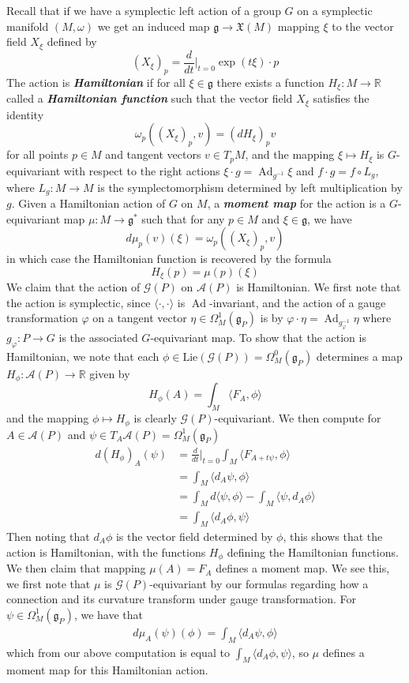 \documentclass[psamsfonts, 12pt]{amsart}
\theoremstyle{definition}
\theoremstyle{remark}
\newcommand{\R}{\mathbb{R}}
\newcommand{\ib}[1]{\textbf{\textit{#1}}}
\newcommand{\g}{\mathfrak{g}}
\newcommand{\inv}{^{-1}}
\DeclareMathOperator{\Ad}{Ad}
\begin{document}
Recall that if we have a symplectic left action of a group $G$ on a symplectic manifold
$(M,\omega)$ we get an induced map $\g \to \mathfrak{X}(M)$ mapping $\xi$ to the vector
field $X_\xi$ defined by
\[
(X_\xi)_p = \frac{d}{dt}\bigg\vert_{t=0} \exp(t\xi)\cdot p
\]
The action is \ib{Hamiltonian} if for all $\xi \in \g$ there exists a function
$H_\xi : M \to \R$ called a \ib{Hamiltonian function} such that the vector field
$X_\xi$ satisfies the identity
\[
\omega_p((X_\xi)_p, v) = (dH_\xi)_p v
\]
for all points $p \in M$ and tangent vectors $v \in T_pM$, and the mapping
$\xi \mapsto H_\xi$ is $G$-equivariant with respect to the right actions
$\xi\cdot g= \Ad_{g\inv}\xi$ and $f \cdot g = f \circ L_g$, where $L_g : M \to M$
is the symplectomorphism determined by left multiplication by $g$. Given a
Hamiltonian action of $G$ on $M$, a \ib{moment map} for the action is a
$G$-equivariant map $\mu : M \to \g^*$ such that for any $p \in M$ and $\xi \in \g$,
we have
\[
d\mu_p(v)(\xi) = \omega_p((X_\xi)_p, v)
\]
in which case the Hamiltonian function is recovered by the formula
\[
H_\xi(p) = \mu(p)(\xi)
\]
We claim that the action of $\mathscr{G}(P)$ on $\mathscr{A}(P)$ is Hamiltonian.
We first note that the action is symplectic, since
$\langle\cdot,\cdot\rangle$ is $\Ad$-invariant, and the action of
a gauge transformation $\varphi$ on a tangent vector $\eta \in \Omega^1_M(\g_P)$
is by $\varphi\cdot\eta = \Ad_{g_\varphi\inv}\eta$ where
$g_\varphi : P \to G$ is the associated $G$-equivariant map. To show that the
action is Hamiltonian, we note that each
$\phi \in \mathrm{Lie}(\mathscr{G}(P)) = \Omega^0_M(\g_P)$ determines
a map $H_\phi : \mathscr{A}(P) \to \R$ given by
\[
H_\phi(A) = \int_M \langle F_A,\phi\rangle
\]
and the mapping $\phi \mapsto H_\phi$ is clearly $\mathscr{G}(P)$-equivariant.
We then compute for
$A \in \mathscr{A}(P)$ and $\psi \in T_A\mathscr{A}(P) = \Omega^1_M(\g_P)$
\begin{align*}
d(H_\phi)_A(\psi)
&= \frac{d}{dt}\bigg\vert_{t=0}\int_M\langle F_{A+t\psi},\phi\rangle \\
&= \int_M \langle d_A\psi,\phi\rangle \\
&= \int_M d\langle\psi,\phi\rangle - \int_M \langle \psi,d_A\phi\rangle \\
&= \int_M\langle d_A\phi,\psi\rangle
\end{align*}
%
Then noting that $d_A\phi$ is the vector field determined by $\phi$, this
shows that the action is Hamiltonian, with the functions $H_\phi$ defining the
Hamiltonian functions. We then claim that mapping $\mu(A) = F_A$ defines a moment map.
We see this, we first note that $\mu$ is $\mathscr{G}(P)$-equivariant by our formulas
regarding how a connection and its curvature transform under gauge transformation.
For $\psi \in \Omega^1_M(\g_P)$, we have that
\begin{align*}
d\mu_A(\psi)(\phi) = \int_M \langle d_A\psi,\phi\rangle
\end{align*}
which from our above computation is equal to $\int_M \langle d_A\phi,\psi\rangle$,
so $\mu$ defines a moment map for this Hamiltonian action.
%
\end{document}

